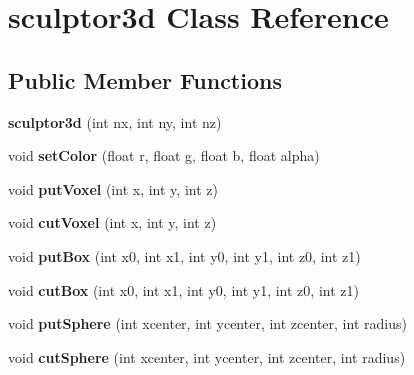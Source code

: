 \hypertarget{classsculptor3d}{}\section{sculptor3d Class Reference}
\label{classsculptor3d}
\subsection*{Public Member Functions}
\begin{DoxyCompactItemize}
\item 
\mbox{\label{classsculptor3d_a36be08ef50a69161c1332f4a1cff226c}} 
{\bfseries sculptor3d} (int nx, int ny, int nz)
\item 
\mbox{\label{classsculptor3d_aba9db4181e1087a09f1de6eee3d03705}} 
void {\bfseries set\+Color} (float r, float g, float b, float alpha)
\item 
\mbox{\label{classsculptor3d_a15cb3ad622cf1b85f3c5811af1fe1ff3}} 
void {\bfseries put\+Voxel} (int x, int y, int z)
\item 
\mbox{\label{classsculptor3d_a3bc32c45bd4de88a0316e709e63fb54f}} 
void {\bfseries cut\+Voxel} (int x, int y, int z)
\item 
\mbox{\label{classsculptor3d_a33ad346684939cacea6c469afad99ffd}} 
void {\bfseries put\+Box} (int x0, int x1, int y0, int y1, int z0, int z1)
\item 
\mbox{\label{classsculptor3d_ac92f60c7e3fd6ec3df820ddd118d7918}} 
void {\bfseries cut\+Box} (int x0, int x1, int y0, int y1, int z0, int z1)
\item 
\mbox{\label{classsculptor3d_a81b399736b253ef298e7cf04feed9607}} 
void {\bfseries put\+Sphere} (int xcenter, int ycenter, int zcenter, int radius)
\item 
\mbox{\label{classsculptor3d_a1e8bf7a173f21c6fd805291ae76e94e8}} 
void {\bfseries cut\+Sphere} (int xcenter, int ycenter, int zcenter, int radius)
\item 
\mbox{\label{classsculptor3d_a0dbd7e2f4ad70f379a38678df1fe7583}} 

\end{DoxyCompactItemize}
